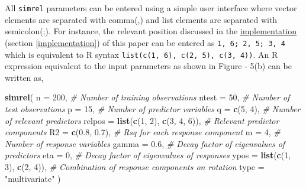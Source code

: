 \documentclass[review]{elsarticle}
\newenvironment{Shaded}{\begin{snugshade}}{\end{snugshade}}
\newcommand{\KeywordTok}[1]{\textcolor[rgb]{0.13,0.29,0.53}{\textbf{#1}}}
\newcommand{\DataTypeTok}[1]{\textcolor[rgb]{0.13,0.29,0.53}{#1}}
\newcommand{\DecValTok}[1]{\textcolor[rgb]{0.00,0.00,0.81}{#1}}
\newcommand{\FloatTok}[1]{\textcolor[rgb]{0.00,0.00,0.81}{#1}}
\newcommand{\StringTok}[1]{\textcolor[rgb]{0.31,0.60,0.02}{#1}}
\newcommand{\CommentTok}[1]{\textcolor[rgb]{0.56,0.35,0.01}{\textit{#1}}}
\newcommand{\NormalTok}[1]{#1}
\theoremstyle{definition}
\theoremstyle{definition}
\theoremstyle{definition}
\theoremstyle{remark}
\begin{document}
All \texttt{simrel} parameters can be entered using a simple user
interface where vector elements are separated with comma(,) and list
elements are separated with semicolon(;). For instance, the relevant
position discussed in the
\protect\hyperlink{implementation}{implementation} (section
\ref{implementation}) of this paper can be entered as
\texttt{1,\ 6;\ 2,\ 5;\ 3,\ 4} which is equivalent to R syntax
\texttt{list(c(1,\ 6),\ c(2,\ 5),\ c(3,\ 4))}. An R expression
equivalent to the input parameters as shown in Figure - 5(b) can be
written as,

\begin{Shaded}
\begin{Highlighting}[]
\KeywordTok{simrel}\NormalTok{(}
  \DataTypeTok{n      =} \DecValTok{200}\NormalTok{, }\CommentTok{# Number of training observations}
  \DataTypeTok{ntest  =} \DecValTok{50}\NormalTok{, }\CommentTok{# Number of test observations}
  \DataTypeTok{p      =} \DecValTok{15}\NormalTok{, }\CommentTok{# Number of predictor variables}
  \DataTypeTok{q      =} \KeywordTok{c}\NormalTok{(}\DecValTok{5}\NormalTok{, }\DecValTok{4}\NormalTok{), }\CommentTok{# Number of relevant predictors}
  \DataTypeTok{relpos =} \KeywordTok{list}\NormalTok{(}\KeywordTok{c}\NormalTok{(}\DecValTok{1}\NormalTok{, }\DecValTok{2}\NormalTok{), }\KeywordTok{c}\NormalTok{(}\DecValTok{3}\NormalTok{, }\DecValTok{4}\NormalTok{, }\DecValTok{6}\NormalTok{)),}
         \CommentTok{# Relevant predictor components}
  \DataTypeTok{R2     =} \KeywordTok{c}\NormalTok{(}\FloatTok{0.8}\NormalTok{, }\FloatTok{0.7}\NormalTok{), }\CommentTok{# Rsq for each response component}
  \DataTypeTok{m      =} \DecValTok{4}\NormalTok{, }\CommentTok{# Number of response variables}
  \DataTypeTok{gamma  =} \FloatTok{0.6}\NormalTok{, }\CommentTok{# Decay factor of eigenvalues of predictors}
  \DataTypeTok{eta    =} \DecValTok{0}\NormalTok{, }\CommentTok{# Decay factor of eigenvalues of responses}
  \DataTypeTok{ypos   =} \KeywordTok{list}\NormalTok{(}\KeywordTok{c}\NormalTok{(}\DecValTok{1}\NormalTok{, }\DecValTok{3}\NormalTok{), }\KeywordTok{c}\NormalTok{(}\DecValTok{2}\NormalTok{, }\DecValTok{4}\NormalTok{)),}
         \CommentTok{# Combination of response components on rotation}
  \DataTypeTok{type   =} \StringTok{"multivariate"}
\NormalTok{)}
\end{Highlighting}
\end{Shaded}
\end{document}
